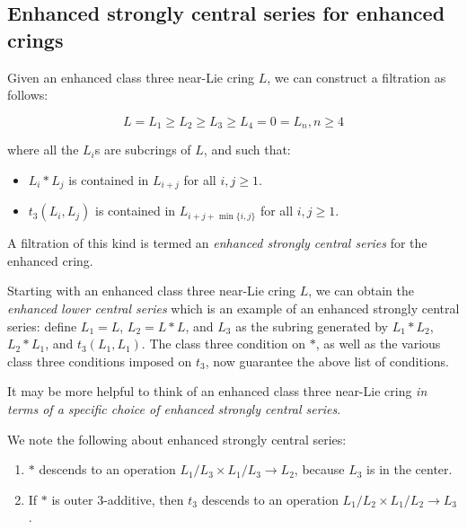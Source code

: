 \documentclass[10pt]{amsart}
\begin{document}
\subsection{Enhanced strongly central series for enhanced crings}

Given an enhanced class three near-Lie cring $L$, we can construct a filtration as follows:

$$L = L_1 \ge L_2 \ge L_3 \ge L_4 = 0 = L_n, n \ge 4$$

where all the $L_i$s are subcrings of $L$, and such that:

\begin{itemize}
\item $L_i * L_j$ is contained in $L_{i+j}$ for all $i,j \ge 1$.
\item $t_3(L_i,L_j)$ is contained in $L_{i + j + \min \{ i,j \}}$ for all $i,j \ge 1$.
\end{itemize}

A filtration of this kind is termed an {\em enhanced strongly central
series} for the enhanced cring.

Starting with an enhanced class three near-Lie cring $L$, we can
obtain the {\em enhanced lower central series} which is an example of
an enhanced strongly central series: define $L_1 = L$, $L_2 = L * L$,
and $L_3$ as the subring generated by $L_1 * L_2$, $L_2 * L_1$, and
$t_3(L_1,L_1)$. The class three condition on $*$, as well as the
various class three conditions imposed on $t_3$, now guarantee the
above list of conditions.

It may be more helpful to think of an enhanced class three near-Lie
cring {\em in terms of a specific choice of enhanced strongly central
series}.

We note the following about enhanced strongly central series:

\begin{lemma}
  \begin{enumerate}
  \item $*$ descends to an operation $L_1/L_3 \times L_1/L_3 \to L_2$,
    because $L_3$ is in the center.
  \item If $*$ is outer $3$-additive, then $t_3$ descends to an
  operation $L_1/L_2 \times L_1/L_2 \to L_3$.
  \end{enumerate}
\end{lemma}
\end{document}
